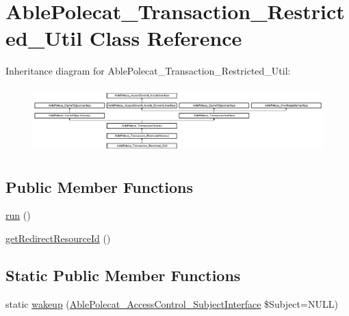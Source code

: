 \hypertarget{class_able_polecat___transaction___restricted___util}{}\section{Able\+Polecat\+\_\+\+Transaction\+\_\+\+Restricted\+\_\+\+Util Class Reference}
\label{class_able_polecat___transaction___restricted___util}
Inheritance diagram for Able\+Polecat\+\_\+\+Transaction\+\_\+\+Restricted\+\_\+\+Util\+:\begin{figure}[H]
\begin{center}
\leavevmode
\includegraphics[height=2.560976cm]{class_able_polecat___transaction___restricted___util}
\end{center}
\end{figure}
\subsection*{Public Member Functions}
\begin{DoxyCompactItemize}
\item 
\hyperlink{class_able_polecat___transaction___restricted___util_afb0fafe7e02a3ae1993c01c19fad2bae}{run} ()
\item 
\hyperlink{class_able_polecat___transaction___restricted___util_abd12d28cbfdd5a45fba85bbac51a0b12}{get\+Redirect\+Resource\+Id} ()
\end{DoxyCompactItemize}
\subsection*{Static Public Member Functions}
\begin{DoxyCompactItemize}
\item 
static \hyperlink{class_able_polecat___transaction___restricted___util_a3f2135f6ad45f51d075657f6d20db2cd}{wakeup} (\hyperlink{interface_able_polecat___access_control___subject_interface}{Able\+Polecat\+\_\+\+Access\+Control\+\_\+\+Subject\+Interface} \$Subject=N\+U\+L\+L)
\end{DoxyCompactItemize}
